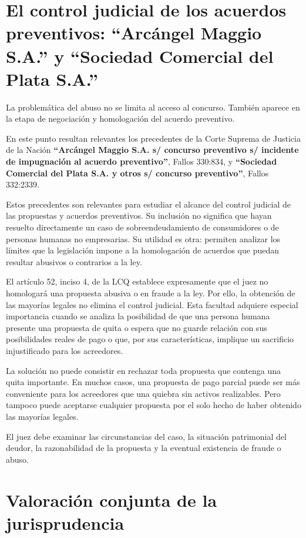 \documentclass[12pt,oneside]{book}
\begin{document}
\section[Control judicial de los acuerdos preventivos]{El control judicial de los acuerdos preventivos: ``Arcángel Maggio S.A.'' y ``Sociedad Comercial del Plata S.A.''}

La problemática del abuso no se limita al acceso al concurso. También aparece en la etapa de negociación y homologación del acuerdo preventivo.

En este punto resultan relevantes los precedentes de la Corte Suprema de Justicia de la Nación \textbf{``Arcángel Maggio S.A. s/ concurso preventivo s/ incidente de impugnación al acuerdo preventivo''}, Fallos 330:834, y \textbf{``Sociedad Comercial del Plata S.A. y otros s/ concurso preventivo''}, Fallos 332:2339.

Estos precedentes son relevantes para estudiar el alcance del control judicial de las propuestas y acuerdos preventivos. Su inclusión no significa que hayan resuelto directamente un caso de sobreendeudamiento de consumidores o de personas humanas no empresarias. Su utilidad es otra: permiten analizar los límites que la legislación impone a la homologación de acuerdos que puedan resultar abusivos o contrarios a la ley.

El artículo 52, inciso 4, de la LCQ establece expresamente que el juez no homologará una propuesta abusiva o en fraude a la ley. Por ello, la obtención de las mayorías legales no elimina el control judicial. Esta facultad adquiere especial importancia cuando se analiza la posibilidad de que una persona humana presente una propuesta de quita o espera que no guarde relación con sus posibilidades reales de pago o que, por sus características, implique un sacrificio injustificado para los acreedores.

La solución no puede consistir en rechazar toda propuesta que contenga una quita importante. En muchos casos, una propuesta de pago parcial puede ser más conveniente para los acreedores que una quiebra sin activos realizables. Pero tampoco puede aceptarse cualquier propuesta por el solo hecho de haber obtenido las mayorías legales.

El juez debe examinar las circunstancias del caso, la situación patrimonial del deudor, la razonabilidad de la propuesta y la eventual existencia de fraude o abuso.

\section{Valoración conjunta de la jurisprudencia}
\end{document}
